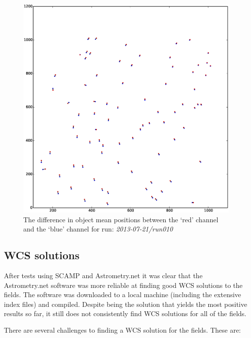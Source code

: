 \begin{figure}
  \centering
  \includegraphics[width=\textwidth]{images/objectOffset_run010_b.eps}
  \caption{The difference in object mean positions between the `red' channel and the `blue' channel for run: \emph{2013-07-21/run010} }
\label{fig:greenblueoffset}
\end{figure}

\subsection{WCS solutions}\label{sect:astrometry}

After tests using SCAMP \citep{scamp} and Astrometry.net \citep{astrometry} it was clear that the Astrometry.net software was more reliable at finding good WCS solutions to the fields. The software was downloaded to a local machine (including the extensive index files) and compiled. Despite being the solution that yields the most positive results so far, it still does not consistently find WCS solutions for all of the fields. 

There are several challenges to finding a WCS solution for the fields.  These are:

